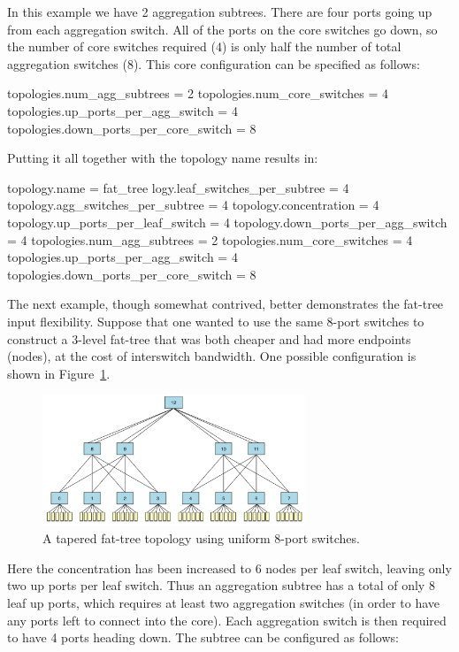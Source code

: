 In this example we have 2 aggregation subtrees.
There are four ports going up from each aggregation switch.
All of the ports on the core switches go down, so the number of core switches required (4) is only half the number of total aggregation switches (8).
This core configuration can be specified as follows:

\begin{ViFile}
topologies.num_agg_subtrees = 2
topologies.num_core_switches = 4
topologies.up_ports_per_agg_switch = 4
topologies.down_ports_per_core_switch = 8
\end{ViFile}

Putting it all together with the topology name results in:

\begin{ViFile}
topology.name = fat_tree
logy.leaf_switches_per_subtree = 4
topology.agg_switches_per_subtree = 4
topology.concentration = 4
topology.up_ports_per_leaf_switch = 4
topology.down_ports_per_agg_switch = 4
topologies.num_agg_subtrees = 2
topologies.num_core_switches = 4
topologies.up_ports_per_agg_switch = 4
topologies.down_ports_per_core_switch = 8
\end{ViFile}

The next example, though somewhat contrived, better demonstrates the fat-tree input flexibility.
Suppose that one wanted to use the same 8-port switches to construct a 3-level fat-tree that was both cheaper and had more endpoints (nodes), at the cost of interswitch bandwidth.
One possible configuration is shown in Figure~\ref{fig:topologies:taperedfattree}.

\begin{figure}[h!]
\centering
\includegraphics[width=0.7\textwidth]{figures/topologies/fattree4-tapered.png}
\caption{A tapered fat-tree topology using uniform 8-port switches.}
\label{fig:topologies:taperedfattree}
\end{figure}

Here the concentration has been increased to 6 nodes per leaf switch, leaving only two up ports per leaf switch.
Thus an aggregation subtree has a total of only 8 leaf up ports, which requires at least two aggregation switches (in order to have any ports left to connect into the core).
Each aggregation switch is then required to have 4 ports heading down.
The subtree can be configured as follows:

